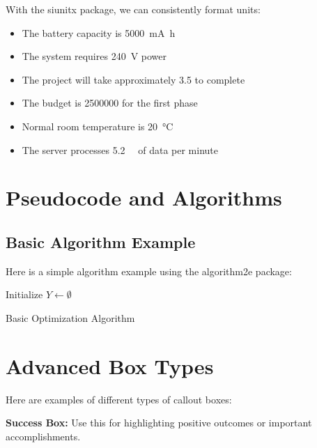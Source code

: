 \documentclass[a4paper,11pt,xetex]{article}
\begin{document}
With the siunitx package, we can consistently format units:

\begin{itemize}
    \item The battery capacity is \SI{5000}{\milli\ampere\hour}
    \item The system requires \SI{240}{\volt} power
    \item The project will take approximately \SI{3.5}{\year} to complete
    \item The budget is \SI{2500000}{\USD} for the first phase
    \item Normal room temperature is \SI{20}{\celsius}
    \item The server processes \SI{5.2}{\giga\byte} of data per minute
\end{itemize}

\section{Pseudocode and Algorithms}
\label{sec:algorithms}

\subsection{Basic Algorithm Example}

Here is a simple algorithm example using the algorithm2e package:

\begin{algorithm}[H]
	\SetAlgoLined
	Initialize $Y \gets \emptyset$\;
	\;
	\caption{Basic Optimization Algorithm}
\end{algorithm}

\section{Advanced Box Types}
\label{sec:boxes}

Here are examples of different types of callout boxes:

\begin{successbox}
\textbf{Success Box:} Use this for highlighting positive outcomes or important accomplishments.
\end{successbox}
\end{document}
